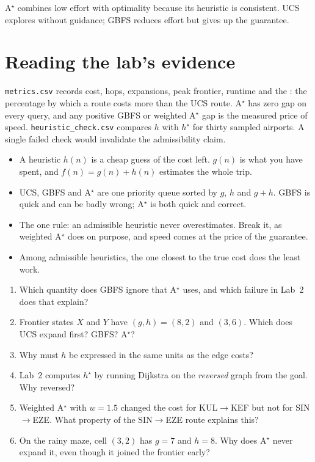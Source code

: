 \begin{keyidea}
A$^\star$ combines low effort with optimality because its heuristic is consistent. UCS explores without guidance; GBFS reduces effort but gives up the guarantee.
\end{keyidea}

\section{Reading the lab's evidence}

\texttt{metrics.csv} records cost, hops, expansions, peak frontier, runtime and the : the percentage by which a route costs more than the UCS route. A$^\star$ has zero gap on every query, and any positive GBFS or weighted A$^\star$ gap is the measured price of speed. \texttt{heuristic\_check.csv} compares $h$ with $h^\star$ for thirty sampled airports. A single failed check would invalidate the admissibility claim.

\begin{chapterrecap}
\begin{itemize}
  \item A heuristic $h(n)$ is a cheap guess of the cost left. $g(n)$ is what you have spent, and $f(n)=g(n)+h(n)$ estimates the whole trip.
  \item UCS, GBFS and A$^\star$ are one priority queue sorted by $g$, $h$ and $g+h$. GBFS is quick and can be badly wrong; A$^\star$ is both quick and correct.
  \item The one rule: an admissible heuristic never overestimates. Break it, as weighted A$^\star$ does on purpose, and speed comes at the price of the guarantee.
  \item Among admissible heuristics, the one closest to the true cost does the least work.
\end{itemize}
\end{chapterrecap}

\begin{quickcheck}
\begin{enumerate}
  \item Which quantity does GBFS ignore that A$^\star$ uses, and which failure in Lab~2 does that explain?
  \item Frontier states $X$ and $Y$ have $(g,h)=(8,2)$ and $(3,6)$. Which does UCS expand first? GBFS? A$^\star$?
  \item Why must $h$ be expressed in the same units as the edge costs?
  \item Lab~2 computes $h^\star$ by running Dijkstra on the \emph{reversed} graph from the goal. Why reversed?
  \item Weighted A$^\star$ with $w=1.5$ changed the cost for KUL$\to$KEF but not for SIN$\to$EZE. What property of the SIN$\to$EZE route explains this?
  \item On the rainy maze, cell $(3,2)$ has $g=7$ and $h=8$. Why does A$^\star$ never expand it, even though it joined the frontier early?
\end{enumerate}
\end{quickcheck}

